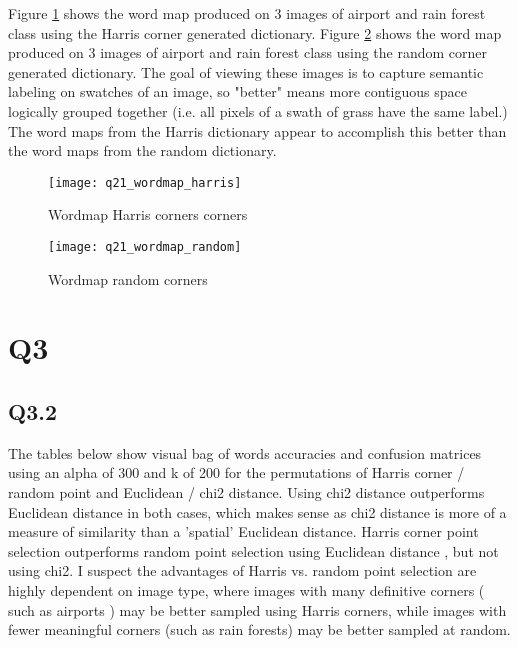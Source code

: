 \documentclass[12pt]{article}
\begin{document}
Figure \ref{fig:wordmapharris} shows the word map produced on 3 images of airport and rain forest class using the Harris corner generated dictionary.
Figure \ref{fig:wordmaprandom} shows the word map produced on 3 images of airport and rain forest class using the random corner generated dictionary.
The goal of viewing these images is to capture semantic labeling on swatches of an image, so "better" means more contiguous space logically grouped together (i.e. all pixels of a swath of grass have the same label.) The word maps from the Harris dictionary appear to accomplish this better than the word maps from the random dictionary.

\begin{figure}[H]
\centering
\texttt{[image: q21\_wordmap\_harris]}
\caption{Wordmap Harris corners corners}    
\label{fig:wordmapharris}
\end{figure}   


\begin{figure}[H]
\centering
\texttt{[image: q21\_wordmap\_random]}
\caption{Wordmap random corners}    
\label{fig:wordmaprandom}
\end{figure}   

\newpage
\section{Q3}
\subsection{Q3.2}

The tables below show visual bag of words accuracies and confusion matrices using an alpha of 300 and k of 200 for the permutations of Harris corner / random point and Euclidean / chi2 distance.  
Using chi2 distance outperforms Euclidean distance in both cases, which makes sense as chi2 distance is more of a measure of similarity than a 'spatial' Euclidean distance.
Harris corner point selection outperforms random point selection using Euclidean distance , but not using chi2. I suspect the advantages of Harris vs. random point selection are highly dependent on image type, where images with many definitive corners ( such as airports ) may be better sampled using Harris corners, while images with fewer meaningful corners (such as rain forests) may be better sampled at random.
\end{document}
